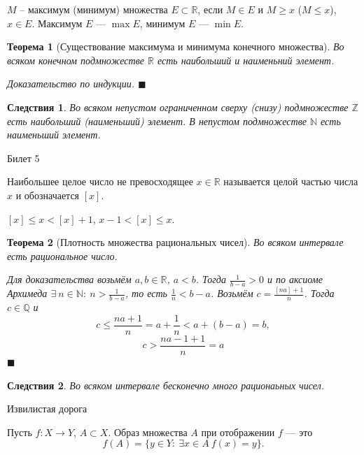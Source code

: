 \documentclass[12pt,a4paper]{article}
\newtheorem*{theorem*}{Теорема}
\newtheorem*{conseq*}{Следствия}
\begin{document}
$M$ -- максимум (минимум) множества $E \subset \mathbb{R}$, если $M \in E$ и $M \geq x$ ($M \leq x$), $x \in E$. Максимум $E$ --- $\max E$, минимум $E$ --- $\min E$.

\begin{theorem*}[Существование максимума и минимума конечного множества]
\label{4.1}
Во всяком конечном подмножестве $\mathbb{R}$ есть наибольший и наименьний элемент.

Доказательство по индукции. $\blacksquare$
\end{theorem*}

\begin{conseq*}
\label{4.2}
Во всяком непустом ограниченном сверху (снизу) подмножестве $\mathbb{Z}$ есть наибольший (наименьший) элемент.
\newline
В непустом подмножестве $\mathbb{N}$ есть наименьший элемент.
\end{conseq*}

\begin{center}
Билет 5
\end{center}

Наибольшее целое число не превосходящее $x \in \mathbb{R}$ называется целой частью числа $x$ и обозначается $[x]$.

$[x] \leq x < [x] + 1$, $x - 1 < [x] \leq x$.

\begin{theorem*}[Плотность множества рациональных чисел]
\label{5.1}
Во всяком интервале есть рациональное число.

Для доказательства возьмём $a, b \in \mathbb{R}$, $a < b$. Тогда $\frac{1}{b-a} > 0$ и по аксиоме Архимеда $\exists\  n \in \mathbb{N}:\ n > \frac{1}{b-a}$, то есть $\frac{1}{n} < b-a$. Возьмём $c=\frac{[na]+1}{n}$. Тогда $c \in \mathbb{Q}$ и
\newline 
$$
c \leq \frac{na+1}{n}=a+\frac{1}{n}<a+(b-a)=b,
$$
$$
c > \frac{na-1+1}{n}=a
$$ $\blacksquare$
\end{theorem*}

\begin{conseq*}
\label{5.2}
Во всяком интервале бесконечно много рационаьных чисел.
\end{conseq*}

\begin{center}
Извилистая дорога
\end{center}

Пусть $f: X \rightarrow Y$, $A \subset X$. Образ множества $A$ при отображении $f$ --- это $$f(A)=\{y \in Y:\ \exists x \in A\ f(x)=y\}.$$
\end{document}

